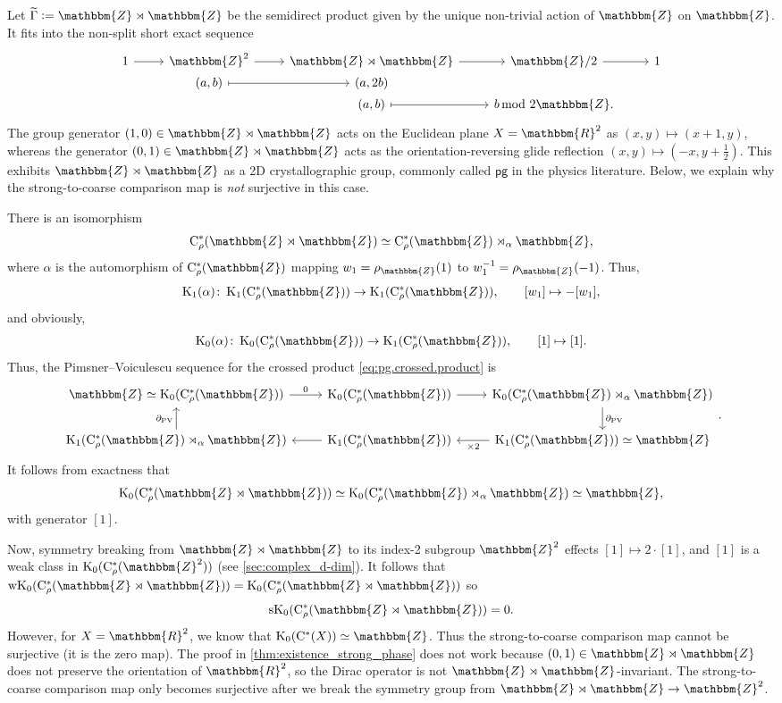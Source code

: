 \documentclass{amsart}
\numberwithin{figure}{section}
\numberwithin{equation}{section}
\numberwithin{table}{section}
\theoremstyle{plain}
\theoremstyle{definition}
\theoremstyle{remark}
\theoremstyle{nonumber}
\newcommand{\Z}{\mathbb{Z}}
\newcommand{\R}{\mathbb{R}}
\newcommand{\K}{\relax\ifmmode\operatorname{K}\else\textup{K}\fi}
\newcommand{\sK}{\operatorname{sK}}
\newcommand{\wK}{\operatorname{wK}}
\newcommand{\Cst}{\relax\ifmmode\mathrm{C}^*\else\textup{C*}\fi}
\newcommand{\Cstr}{\Cst_\rho} %
\newcommand{\defeq}{\mathrel{\vcentcolon=}}
\renewcommand{\mathbb}{\mathbbm} %
\begin{document}
Let \(\widetilde{\Gamma}\defeq\Z\rtimes\Z\) be the semidirect product given by the unique non-trivial action of \(\Z\) on \(\Z\). It fits into the non-split short exact sequence
\[
\begin{tikzcd}[row sep=0]
1\ar[r] & \Z^2 \ar[r] & \Z\rtimes\Z \ar[r] & \Z/2 \ar[r] & 1\\
{} & (a,b)\ar[r,mapsto] & (a,2b) & {} & {} \\
{} & {} & (a,b) \ar[r,mapsto] & b\!\!\!\mod 2\Z. & {}
\end{tikzcd}
\]
The group generator $(1,0)\in\Z\rtimes\Z$ acts on the Euclidean plane
$X=\R^2$ as $(x,y)\mapsto (x+1,y)$, whereas the generator
$(0,1)\in\Z\rtimes\Z$ acts as the orientation-reversing glide reflection
$(x,y)\mapsto (-x,y+\tfrac{1}{2})$. This exhibits $\Z\rtimes\Z$ as a 2D
crystallographic group, commonly called $\mathsf{pg}$ in the physics
literature. Below, we explain why the strong-to-coarse comparison map is
\emph{not} surjective in this case.

There is an isomorphism
\begin{equation}\label{eq:pg.crossed.product}
\Cstr(\Z\rtimes\Z)\simeq\Cstr(\Z)\rtimes_\alpha\Z,
\end{equation}
where $\alpha$ is the automorphism of $\Cstr(\Z)$ mapping $w_1=\rho_\Z(1)$ to $w_1^{-1}=\rho_\Z(-1)$. Thus,
\[
\K_1(\alpha)\colon \K_1(\Cstr(\Z))\to\K_1(\Cstr(\Z)),\qquad [w_1]\mapsto -[w_1],
\]
and obviously,
\[
\K_0(\alpha)\colon \K_0(\Cstr(\Z))\to\K_1(\Cstr(\Z)),\qquad [1]\mapsto [1].
\]
Thus, the Pimsner--Voiculescu sequence \cite{Pimnser-Voiculescu:Exact_sequence} for the crossed product \eqref{eq:pg.crossed.product} is
\[
\begin{tikzcd}
\Z\simeq\K_0(\Cstr(\Z))\ar[r,"0"] & \K_0(\Cstr(\Z)) \ar[r] & \K_0(\Cstr(\Z)\rtimes_\alpha\Z)\ar[d,"\partial_{\rm PV}"]\\
\K_1(\Cstr(\Z)\rtimes_\alpha\Z)\ar[u,"\partial_{\rm PV}"] & \K_1(\Cstr(\Z))\ar[l] & \K_1(\Cstr(\Z))\simeq\Z\ar[l,"\times 2"]
\end{tikzcd}.
\]
It follows from exactness that
\[
\K_0(\Cstr(\Z\rtimes\Z))\simeq\K_0(\Cstr(\Z)\rtimes_\alpha\Z)\simeq\Z,
\]
with generator $[1]$. 

Now, symmetry breaking from $\Z\rtimes\Z$ to its index-2 subgroup $\Z^2$
effects $[1]\mapsto 2\cdot[1]$, and $[1]$ is a weak class in
$\K_0(\Cstr(\Z^2))$ (see \cref{sec:complex_d-dim}). It follows that
$\wK_0(\Cstr(\Z\rtimes\Z))=\K_0(\Cstr(\Z\rtimes\Z))$ 
so
\[
  \sK_0(\Cstr(\Z\rtimes\Z))=0.
\]
However, for $X=\R^2$, we know that $\K_0(\Cst(X))\simeq\Z$. Thus the
strong-to-coarse comparison map cannot be surjective (it is the zero
map). The proof in \cref{thm:existence_strong_phase} does not work because
$(0,1)\in\Z\rtimes\Z$ does not preserve the orientation of $\R^2$, so the
Dirac operator is not $\Z\rtimes\Z$-invariant. The strong-to-coarse
comparison map only becomes surjective after we break the symmetry group
from $\Z\rtimes\Z \to \Z^2$.
\end{document}
